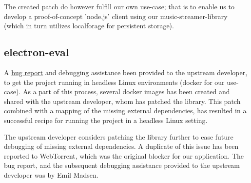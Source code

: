 The created patch do however fulfill our own use-case; that is to enable us to 
develop a proof-of-concept 'node.js' client using our music-streamer-library
(which in turn utilizes localforage for persistent storage).

\subsection{electron-eval}
\label{subsec:appendix-electron-eval}
A \href{https://github.com/mappum/electron-eval/issues/29}{bug report} and 
debugging assistance been provided to the upstream developer, to get the project
running in headless Linux environments (docker for our use-case).
\newline\newline
As a part of this process, several docker images has been created and shared
with the upstream developer, whom has patched the library. This patch combined
with a mapping of the missing external dependencies, has resulted in a
successful recipe for running the project in a headless Linux setting.

The upstream developer considers patching the library further to ease future 
debugging of missing external dependencies. A duplicate of this issue has been
reported to WebTorrent, which was the original blocker for our application.
\newline\newline
The bug report, and the subsequent debugging assistance provided to the
upstream developer was by Emil Madsen.

